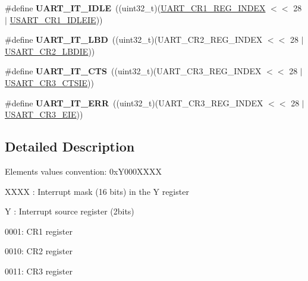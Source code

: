 \begin{DoxyCompactItemize}
\item 
\#define {\bfseries U\+A\+R\+T\+\_\+\+I\+T\+\_\+\+I\+D\+LE}~((uint32\+\_\+t)(\hyperlink{group___u_a_r_t___private___constants_ga5917bcb19b2dab202b8cbfa82520b93e}{U\+A\+R\+T\+\_\+\+C\+R1\+\_\+\+R\+E\+G\+\_\+\+I\+N\+D\+EX} $<$$<$ 28 $\vert$ \hyperlink{group___peripheral___registers___bits___definition_ga5221d09eebd12445a20f221bf98066f8}{U\+S\+A\+R\+T\+\_\+\+C\+R1\+\_\+\+I\+D\+L\+E\+IE}))\hypertarget{group___u_a_r_t___interrupt__definition_ga9781808d4f9999061fc2da36572191d9}{}\label{group___u_a_r_t___interrupt__definition_ga9781808d4f9999061fc2da36572191d9}

\item 
\#define {\bfseries U\+A\+R\+T\+\_\+\+I\+T\+\_\+\+L\+BD}~((uint32\+\_\+t)(U\+A\+R\+T\+\_\+\+C\+R2\+\_\+\+R\+E\+G\+\_\+\+I\+N\+D\+EX $<$$<$ 28 $\vert$ \hyperlink{group___peripheral___registers___bits___definition_gaa02ef5d22553f028ea48e5d9f08192b4}{U\+S\+A\+R\+T\+\_\+\+C\+R2\+\_\+\+L\+B\+D\+IE}))\hypertarget{group___u_a_r_t___interrupt__definition_gabca5e77508dc2dd9aa26fcb683d9b988}{}\label{group___u_a_r_t___interrupt__definition_gabca5e77508dc2dd9aa26fcb683d9b988}

\item 
\#define {\bfseries U\+A\+R\+T\+\_\+\+I\+T\+\_\+\+C\+TS}~((uint32\+\_\+t)(U\+A\+R\+T\+\_\+\+C\+R3\+\_\+\+R\+E\+G\+\_\+\+I\+N\+D\+EX $<$$<$ 28 $\vert$ \hyperlink{group___peripheral___registers___bits___definition_ga636d5ec2e9556949fc68d13ad45a1e90}{U\+S\+A\+R\+T\+\_\+\+C\+R3\+\_\+\+C\+T\+S\+IE}))\hypertarget{group___u_a_r_t___interrupt__definition_ga986d271478550f9afa918262ca642333}{}\label{group___u_a_r_t___interrupt__definition_ga986d271478550f9afa918262ca642333}

\item 
\#define {\bfseries U\+A\+R\+T\+\_\+\+I\+T\+\_\+\+E\+RR}~((uint32\+\_\+t)(U\+A\+R\+T\+\_\+\+C\+R3\+\_\+\+R\+E\+G\+\_\+\+I\+N\+D\+EX $<$$<$ 28 $\vert$ \hyperlink{group___peripheral___registers___bits___definition_gaaed1a39c551b1641128f81893ff558d0}{U\+S\+A\+R\+T\+\_\+\+C\+R3\+\_\+\+E\+IE}))\hypertarget{group___u_a_r_t___interrupt__definition_ga8eb26d8edd9bf78ae8d3ad87dd51b618}{}\label{group___u_a_r_t___interrupt__definition_ga8eb26d8edd9bf78ae8d3ad87dd51b618}

\end{DoxyCompactItemize}


\subsection{Detailed Description}
Elements values convention\+: 0x\+Y000\+X\+X\+XX
\begin{DoxyItemize}
\item X\+X\+XX \+: Interrupt mask (16 bits) in the Y register
\item Y \+: Interrupt source register (2bits)
\begin{DoxyItemize}
\item 0001\+: C\+R1 register
\item 0010\+: C\+R2 register
\item 0011\+: C\+R3 register 
\end{DoxyItemize}
\end{DoxyItemize}